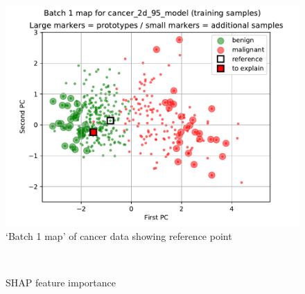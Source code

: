 %
\begin{figure}
\caption{`Batch 1 map' of cancer data showing reference point}
\label{fig_batch_1_map_reference}
%
\begin{center}
\includegraphics[height=0.4\textheight]{figures/cancer_batch_1_map_training_data_reference.pdf}
\end{center}
\end{figure}
%
\begin{figure}
\caption{SHAP feature importance}
\label{fig_feature_importance}
%
\begin{center}
\\
\end{center}
\end{figure}
%

